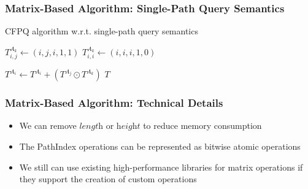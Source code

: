 \documentclass[xcolor=table]{beamer}
\begin{document}
  \begin{frame}[fragile] \frametitle{Matrix-Based Algorithm: Single-Path Query Semantics}
\begin{algorithm}[H]
	\begin{algorithmic}[1]
		\caption{CFPQ algorithm w.r.t. single-path query semantics}
		\label{lst:algo2}
		{$T^{A_k}_{i,j} \gets (i,j,i,1,1)$}
		\EndFor
		{$T^{A_k}_{i,i} \gets (i,i,i,1,0)$}
		\EndFor
		
		{ $T^{A_i} \gets T^{A_i} + (T^{A_j} \odot T^{A_k})$ } 
		\EndFor
		\EndWhile
		\State \Return $T$
		\EndFunction
	\end{algorithmic}
\end{algorithm}
\end{frame}

  \begin{frame}[fragile] \frametitle{Matrix-Based Algorithm: Technical Details}
    \begin{itemize}
      \item We can remove $\textit{length}$ or $\textit{height}$ to reduce memory consumption
      \item The PathIndex operations can be represented as bitwise atomic operations
      \item We still can use existing high-performance libraries for matrix operations if they support the creation of custom operations
    \end{itemize}
  \end{frame}


%  	
%  	
\end{document}
